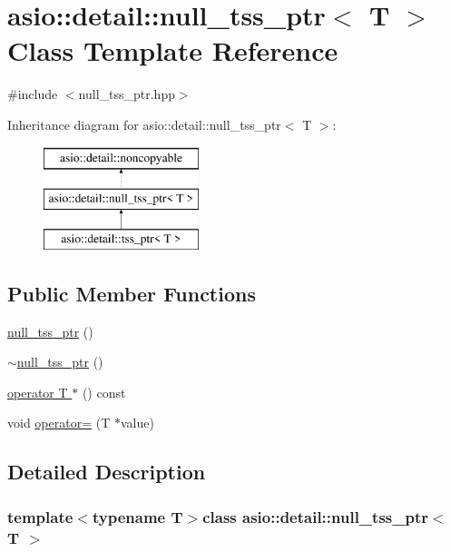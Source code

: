 \hypertarget{classasio_1_1detail_1_1null__tss__ptr}{}\section{asio\+:\+:detail\+:\+:null\+\_\+tss\+\_\+ptr$<$ T $>$ Class Template Reference}
\label{classasio_1_1detail_1_1null__tss__ptr}


{\ttfamily \#include $<$null\+\_\+tss\+\_\+ptr.\+hpp$>$}

Inheritance diagram for asio\+:\+:detail\+:\+:null\+\_\+tss\+\_\+ptr$<$ T $>$\+:\begin{figure}[H]
\begin{center}
\leavevmode
\includegraphics[height=3.000000cm]{classasio_1_1detail_1_1null__tss__ptr}
\end{center}
\end{figure}
\subsection*{Public Member Functions}
\begin{DoxyCompactItemize}
\item 
\hyperlink{classasio_1_1detail_1_1null__tss__ptr_ad6af39fee5cc894e72de424acf2c41f0}{null\+\_\+tss\+\_\+ptr} ()
\item 
\hyperlink{classasio_1_1detail_1_1null__tss__ptr_ac9fb3a606866c32e038dcf8d05afae5a}{$\sim$null\+\_\+tss\+\_\+ptr} ()
\item 
\hyperlink{classasio_1_1detail_1_1null__tss__ptr_aad933ac836273d1d5f1269563cba0996}{operator T $\ast$} () const 
\item 
void \hyperlink{classasio_1_1detail_1_1null__tss__ptr_a3ac0fe425745c57878a69b8ed24e146d}{operator=} (T $\ast$value)
\end{DoxyCompactItemize}


\subsection{Detailed Description}
\subsubsection*{template$<$typename T$>$class asio\+::detail\+::null\+\_\+tss\+\_\+ptr$<$ T $>$}



